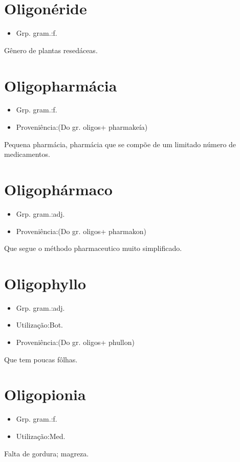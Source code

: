 \section{Oligonéride}
\begin{itemize}
\item {Grp. gram.:f.}
\end{itemize}
Gênero de plantas resedáceas.
\section{Oligopharmácia}
\begin{itemize}
\item {Grp. gram.:f.}
\end{itemize}
\begin{itemize}
\item {Proveniência:(Do gr. \textunderscore oligos\textunderscore  + \textunderscore pharmakeía\textunderscore )}
\end{itemize}
Pequena pharmácia, pharmácia que se compõe de um limitado número de medicamentos.
\section{Oligophármaco}
\begin{itemize}
\item {Grp. gram.:adj.}
\end{itemize}
\begin{itemize}
\item {Proveniência:(Do gr. \textunderscore oligos\textunderscore  + \textunderscore pharmakon\textunderscore )}
\end{itemize}
Que segue o méthodo pharmaceutico muito simplificado.
\section{Oligophyllo}
\begin{itemize}
\item {Grp. gram.:adj.}
\end{itemize}
\begin{itemize}
\item {Utilização:Bot.}
\end{itemize}
\begin{itemize}
\item {Proveniência:(Do gr. \textunderscore oligos\textunderscore  + \textunderscore phullon\textunderscore )}
\end{itemize}
Que tem poucas fôlhas.
\section{Oligopionia}
\begin{itemize}
\item {Grp. gram.:f.}
\end{itemize}
\begin{itemize}
\item {Utilização:Med.}
\end{itemize}
Falta de gordura; magreza.
